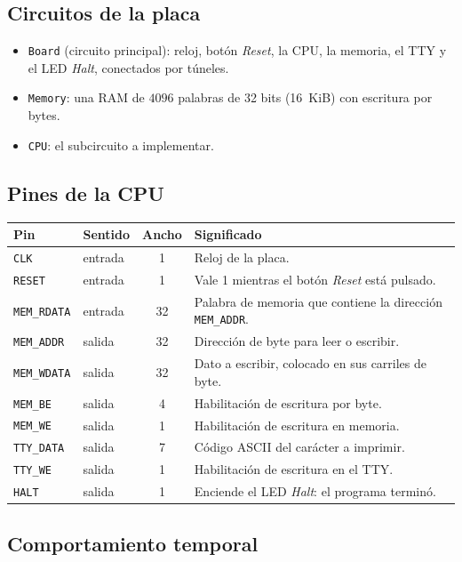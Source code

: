\documentclass[11pt,a4paper]{article}
\newcommand{\sig}[1]{\texttt{#1}}
\begin{document}
\subsection{Circuitos de la placa}

\begin{itemize}
\item \sig{Board} (circuito principal): reloj, botón \emph{Reset}, la CPU, la memoria, el TTY y el LED \emph{Halt}, conectados por túneles.
\item \sig{Memory}: una RAM de $4096$ palabras de 32 bits (16~KiB) con escritura por bytes.
\item \sig{CPU}: el subcircuito a implementar.
\end{itemize}

\subsection{Pines de la CPU}

\begin{center}
\begin{tabularx}{\linewidth}{@{}llcX@{}}
\toprule
Pin & Sentido & Ancho & Significado \\
\midrule
\sig{CLK} & entrada & 1 & Reloj de la placa. \\
\sig{RESET} & entrada & 1 & Vale 1 mientras el botón \emph{Reset} está pulsado. \\
\sig{MEM\_RDATA} & entrada & 32 & Palabra de memoria que contiene la dirección \sig{MEM\_ADDR}. \\
\sig{MEM\_ADDR} & salida & 32 & Dirección de byte para leer o escribir. \\
\sig{MEM\_WDATA} & salida & 32 & Dato a escribir, colocado en sus carriles de byte. \\
\sig{MEM\_BE} & salida & 4 & Habilitación de escritura por byte. \\
\sig{MEM\_WE} & salida & 1 & Habilitación de escritura en memoria. \\
\sig{TTY\_DATA} & salida & 7 & Código ASCII del carácter a imprimir. \\
\sig{TTY\_WE} & salida & 1 & Habilitación de escritura en el TTY. \\
\sig{HALT} & salida & 1 & Enciende el LED \emph{Halt}: el programa terminó. \\
\bottomrule
\end{tabularx}
\end{center}

\subsection{Comportamiento temporal}
\end{document}
